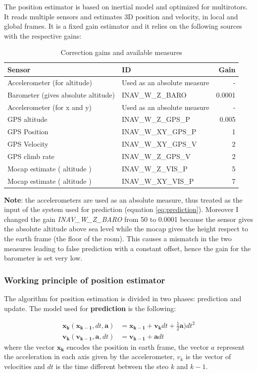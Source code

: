 The position estimator is based on inertial model and optimized for multirotors. It reads multiple sensors and estimates 3D position and velocity, in local and global frames. It is a fixed gain estimator and it relies on the following sources with the respective gains:
\begin{table}[H]
		\centering
	\begin{tabular}{l l r}
		\textbf{Sensor} & \textbf{ID} & \textbf{Gain} \\ \hline
		Accelerometer (for altitude) & Used as an absolute measure & - \\
		Barometer (gives absolute altitude)  & INAV\_W\_Z\_BARO & 0.0001  \\
		Accelerometer (for x and y) & Used as an absolute measure & - \\
		GPS altitude & INAV\_W\_Z\_GPS\_P & 0.005 \\
		GPS Position & INAV\_W\_XY\_GPS\_P & 1 \\
		GPS Velocity & INAV\_W\_XY\_GPS\_V & 2 \\
	    GPS climb rate & INAV\_W\_Z\_GPS\_V & 2 \\	
		Mocap estimate ( altitude ) & INAV\_W\_Z\_VIS\_P & 5 \\
		Mocap estimate ( altitude ) & INAV\_W\_XY\_VIS\_P & 7 \\
	\end{tabular}
	\caption{Correction gains and available measures}
	\label{tab:corrgain}
\end{table}
\textbf{Note}: the accelerometers are used as an absolute measure, thus treated as the input of the system used for prediction (equation \ref{eq:prediction}). Moreover I changed the gain \textit{INAV\_W\_Z\_BARO} from 50 to 0.0001 because the sensor gives the absolute altitude above sea level while the mocap gives the height respect to the earth frame (the floor of the room). This causes a mismatch in the two measures leading to false prediction with a constant offset, hence the gain for the barometer is set very low.

\subsubsection*{Working principle of position estimator}
The algorithm for position estimation is divided in two phases: prediction and update. The model used for \textbf{prediction} is the following: 

\begin{equation}
	\begin{aligned}
	\boldsymbol{x_k}(\boldsymbol{x_{k-1}}, dt , \boldsymbol{a})& = \boldsymbol{x_{k-1}} + \boldsymbol{v_k}dt + \frac{1}{2}\boldsymbol{a}) dt^2 \\
	 \boldsymbol{v_k} ( \boldsymbol{v_{k-1}} ,\boldsymbol{a} , dt)& = \boldsymbol{v_{k-1}} + \boldsymbol{a}dt
	\end{aligned}
	\label{eq:prediction}
\end{equation}
where the vector $\boldsymbol{x_k}$ encodes the position in earth frame, the vector $a$ represent the acceleration in each axis given by the accelerometer, $v_k$ is the vector of velocities and $dt$ is the time different between the steo $k$ and $k-1$.\\

